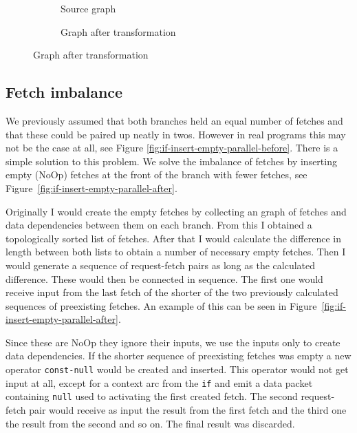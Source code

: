 \begin{figure}[h]
  \begin{subfigure}[b]{0.65\textwidth}
    \caption{Source graph}
    \label{fig:if-trans-before}
  \end{subfigure}

  \begin{subfigure}[b]{.35\textwidth}
  \end{subfigure}

  \begin{subfigure}{\textwidth}
      \caption{Graph after transformation}
      \label{fig:if-trans-merged}
  \end{subfigure}
\end{figure}

\subsection{Fetch imbalance}

We previously assumed that both branches held an equal number of fetches and that these could be paired up neatly in twos.
However in real programs this may not be the case at all, see Figure \ref{fig:if-insert-empty-parallel-before}.
There is a simple solution to this problem.
We solve the imbalance of fetches by inserting empty (NoOp) fetches at the front of the branch with fewer fetches, see Figure~\ref{fig:if-insert-empty-parallel-after}.

Originally I would create the empty fetches by collecting an graph of fetches and data dependencies between them on each branch.
From this I obtained a topologically sorted list of fetches.
After that I would calculate the difference in length between both lists to obtain a number of necessary empty fetches.
Then I would generate a sequence of request-fetch pairs as long as the calculated difference.
These would then be connected in sequence.
The first one would receive input from the last fetch of the shorter of the two previously calculated sequences of preexisting fetches.
An example of this can be seen in Figure~\ref{fig:if-insert-empty-parallel-after}.

Since these are NoOp they ignore their inputs, we use the inputs only to create data dependencies.
If the shorter sequence of preexisting fetches was empty a new operator \texttt{const-null} would be created and inserted.
This operator would not get input at all, except for a context arc from the \texttt{if} and emit a data packet containing \texttt{null} used to activating the first created fetch.
The second request-fetch pair would receive as input the result from the first fetch and the third one the result from the second and so on.
The final result was discarded.

